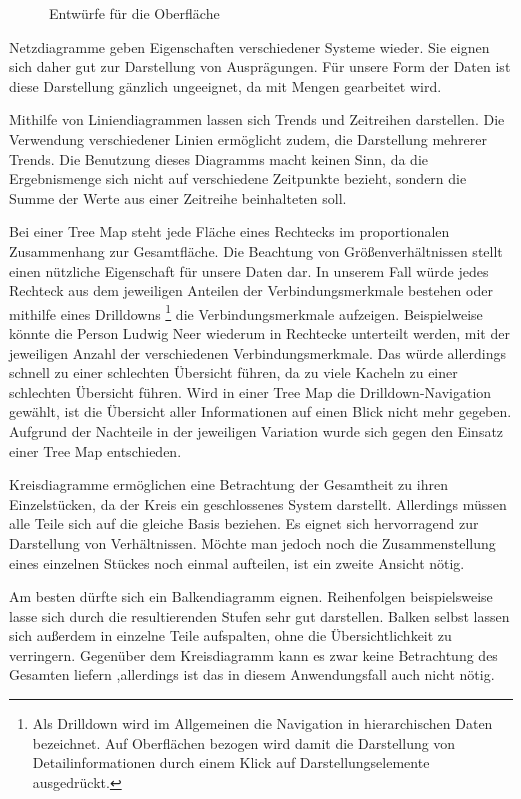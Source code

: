 \begin{figure}[H]
\caption{Entwürfe für die Oberfläche}
\label{konzept_darstellung}
\end{figure}

Netzdiagramme geben Eigenschaften verschiedener Systeme wieder. Sie eignen sich daher gut zur Darstellung von Ausprägungen. Für unsere Form der Daten ist diese Darstellung gänzlich ungeeignet, da mit Mengen gearbeitet wird. 

Mithilfe von Liniendiagrammen lassen sich Trends und Zeitreihen darstellen. Die Verwendung verschiedener Linien ermöglicht zudem, die Darstellung mehrerer Trends. Die Benutzung dieses Diagramms macht keinen Sinn, da die Ergebnismenge sich nicht auf verschiedene Zeitpunkte bezieht, sondern die Summe der Werte aus einer Zeitreihe beinhalteten soll. 

Bei einer Tree Map steht jede Fläche eines Rechtecks im proportionalen Zusammenhang zur Gesamtfläche. Die Beachtung von Größenverhältnissen stellt einen nützliche Eigenschaft für unsere Daten dar. In unserem Fall würde jedes Rechteck aus dem jeweiligen Anteilen der Verbindungsmerkmale bestehen oder mithilfe eines Drilldowns
\footnote{Als Drilldown wird im Allgemeinen die Navigation in hierarchischen Daten bezeichnet. Auf Oberflächen bezogen wird damit die Darstellung von Detailinformationen durch einem Klick auf Darstellungselemente ausgedrückt. }
 die Verbindungsmerkmale aufzeigen. Beispielweise könnte die Person Ludwig Neer wiederum in Rechtecke unterteilt werden, mit der jeweiligen Anzahl der verschiedenen Verbindungsmerkmale. Das würde allerdings schnell zu einer schlechten Übersicht führen, da zu viele Kacheln zu einer schlechten Übersicht führen. Wird in einer Tree Map die Drilldown-Navigation gewählt, ist die Übersicht aller Informationen auf einen Blick nicht mehr gegeben. Aufgrund der Nachteile in der jeweiligen Variation wurde sich gegen den Einsatz einer Tree Map entschieden.

Kreisdiagramme ermöglichen eine Betrachtung der Gesamtheit zu ihren Einzelstücken, da der Kreis ein geschlossenes System darstellt. Allerdings müssen alle Teile sich auf die gleiche Basis beziehen. Es eignet sich hervorragend zur Darstellung von Verhältnissen. Möchte man jedoch noch die Zusammenstellung eines einzelnen Stückes noch einmal aufteilen, ist ein zweite Ansicht nötig. 

Am besten dürfte sich ein Balkendiagramm eignen. Reihenfolgen beispielsweise lasse sich durch die resultierenden Stufen sehr gut darstellen. Balken selbst lassen sich außerdem in einzelne Teile aufspalten, ohne die Übersichtlichkeit zu verringern. Gegenüber dem Kreisdiagramm kann es zwar keine Betrachtung des Gesamten liefern ,allerdings ist das in diesem Anwendungsfall auch nicht nötig. 